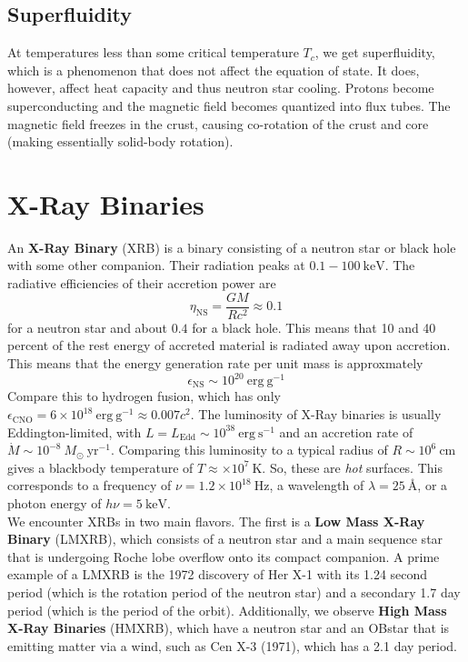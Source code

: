 \documentclass[10pt]{article}
\numberwithin{equation}{section}
\newcommand{\n}{\noindent}
\begin{document}
	\subsection{Superfluidity} %
	\label{sub:superfluidity}
	At temperatures less than some critical temperature $T_c$, we get superfluidity, which is a phenomenon that does not affect the equation of state. It does, however, affect heat capacity and thus neutron star cooling. Protons become superconducting and the magnetic field becomes quantized into flux tubes. The magnetic field freezes in the crust, causing co-rotation of the crust and core (making essentially solid-body rotation).
\section{X-Ray Binaries} %
\label{sec:x_ray_binaries}
	An \textbf{X-Ray Binary} (XRB) is a binary consisting of a neutron star or black hole with some other companion. Their radiation peaks at $0.1-100\ \mathrm{keV}$. The radiative efficiencies of their accretion power are
	\begin{equation}
		\label{eq:x_ray_binary:1} \eta_{\mathrm{NS}} = \frac{GM}{Rc^2} \approx 0.1
	\end{equation}
	for a neutron star and about $0.4$ for a black hole. This means that 10 and 40 percent of the rest energy of accreted material is radiated away upon accretion. This means that the energy generation rate per unit mass is approxmately
	\begin{equation}
		\label{eq:x_ray_binary:2} \epsilon_{\mathrm{NS}}\sim 10^{20}\ \mathrm{erg\ g^{-1}}
	\end{equation}
	Compare this to hydrogen fusion, which has only $\epsilon_{\mathrm{CNO}}=6\times 10^{18}\ \mathrm{erg\ g^{-1}}\approx 0.007c^2$. The luminosity of X-Ray binaries is usually Eddington-limited, with $L=L_{\mathrm{Edd}}\sim 10^{38}\ \mathrm{erg\ s^{-1}}$ and an accretion rate of $\dot{M}\sim 10^{-8}\ M_\odot\ \mathrm{yr^{-1}}$. Comparing this luminosity to a typical radius of $R\sim 10^6\ \mathrm{cm}$ gives a blackbody temperature of $T\approx \times 10^{7}\ \mathrm{K}$. So, these are \emph{hot} surfaces. This corresponds to a frequency of $\nu=1.2\times 10^{18}\ \mathrm{Hz}$, a wavelength of $\lambda = 25\ \textrm{\AA}$, or a photon energy of $h\nu = 5\ \mathrm{keV}$.\\
	
	\n We encounter XRBs in two main flavors. The first is a \textbf{Low Mass X-Ray Binary} (LMXRB), which consists of a neutron star and a main sequence star that is undergoing Roche lobe overflow onto its compact companion. A prime example of a LMXRB is the 1972 discovery of Her X-1 with its 1.24 second period (which is the rotation period of the neutron star) and a secondary 1.7 day period (which is the period of the orbit). Additionally, we observe \textbf{High Mass X-Ray Binaries} (HMXRB), which have a neutron star and an OBstar that is emitting matter via a wind, such as Cen X-3 (1971), which has a 2.1 day period.\\
	
\end{document}
